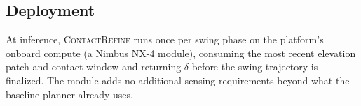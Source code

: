 \subsection{Deployment}
At inference, \textsc{ContactRefine} runs once per swing phase on the platform's onboard
compute (a Nimbus NX-4 module), consuming the most recent elevation patch and contact window
and returning $\delta$ before the swing trajectory is finalized. The module adds no additional
sensing requirements beyond what the baseline planner already uses.
